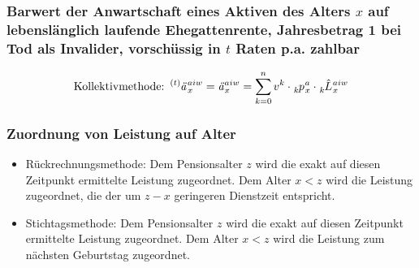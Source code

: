 \documentclass[12pt]{report}
\theoremstyle{dotless}
\theoremstyle{definition}
\begin{document}
\subsubsection{Barwert der Anwartschaft eines Aktiven des Alters $x$ auf lebenslänglich laufende Ehegattenrente, Jahresbetrag 1 bei Tod als Invalider, vorschüssig in $t$ Raten p.a. zahlbar}
\begin{equation}
	\text{Kollektivmethode: } \tensor[^{(t)}]{\text{\textit{ä}}}{}_x^{aiw}=\text{\textit{ä}}_x^{aiw}=\sum_{k = 0}^n v^k \cdot \tensor[_{k}]{p}{}_x^a \cdot \tensor[_{k}]{\hat{L}}{}_x^{aiw}
\end{equation}

\subsubsection{Zuordnung von Leistung auf Alter}
\begin{itemize}
	\item Rückrechnungsmethode: Dem Pensionsalter $z$ wird die exakt auf diesen Zeitpunkt ermittelte Leistung zugeordnet. Dem Alter $x<z$ wird die Leistung zugeordnet, die der um $z-x$ geringeren Dienstzeit entspricht.
	\item Stichtagsmethode: Dem Pensionsalter $z$ wird die exakt auf diesen Zeitpunkt ermittelte Leistung zugeordnet. Dem Alter $x<z$ wird die Leistung zum nächsten Geburtstag zugeordnet.
\end{itemize}
\end{document}
